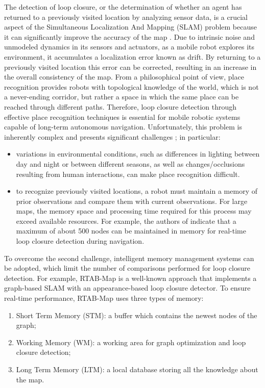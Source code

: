 \documentclass[letterpaper, 10 pt, conference]{ieeeconf}  %
\begin{document}
The detection of loop closure, or the determination of whether an agent has returned to a previously visited location by analyzing sensor data, is a crucial aspect of the Simultaneous Localization And Mapping (SLAM) problem because it can significantly improve the accuracy of the map \cite{b1}. Due to intrinsic noise and unmodeled dynamics in its sensors and actuators, as a mobile robot explores its environment, it accumulates a localization error known as drift. By returning to a previously visited location this error can be corrected, resulting in an increase in the overall consistency of the map. From a philosophical point of view, place recognition provides robots with topological knowledge of the world, which is not a never-ending corridor, but rather a space in which the same place can be reached through different paths. Therefore, loop closure detection through effective place recognition techniques is essential for mobile robotic systems capable of long-term autonomous navigation. Unfortunately, this problem is inherently complex and presents significant challenges \cite{b2}; in particular:
\begin{itemize}
    \item variations in environmental conditions, such as differences in lighting between day and night or between different seasons, as well as changes/occlusions resulting from human interactions, can make place recognition difficult.  
    \item to recognize previously visited locations, a robot must maintain a memory of prior observations and compare them with current observations. For large maps, the memory space and processing time required for this process may exceed available resources. For example, the authors of \cite{b3} indicate that a maximum of about 500 nodes can be maintained in memory for real-time loop closure detection during navigation.  
\end{itemize}

To overcome the second challenge, intelligent memory management systems can be adopted, which limit the number of comparisons performed for loop closure detection. For example, RTAB-Map \cite{b4} is a well-known approach that implements a graph-based SLAM with an appearance-based loop closure detector. To ensure real-time performance, RTAB-Map uses three types of memory: 

\begin{enumerate}
    \item Short Term Memory (STM): a buffer which contains the newest nodes of the graph; 
    \item Working Memory (WM): a working area for graph optimization and loop closure detection; 
    \item Long Term Memory (LTM): a local database storing all the knowledge about the map. 
\end{enumerate}
\end{document}
